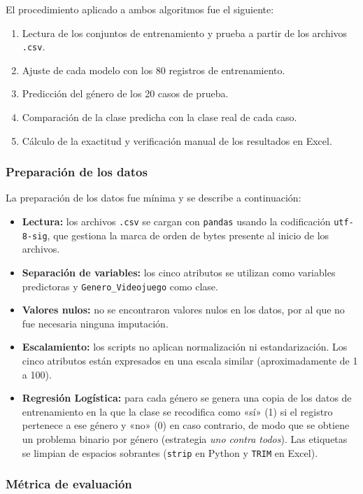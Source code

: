 \documentclass[]{article}
\begin{document}
El procedimiento aplicado a ambos algoritmos fue el siguiente:
\begin{enumerate}[nosep]
  \item Lectura de los conjuntos de entrenamiento y prueba a partir de los archivos \texttt{.csv}.
  \item Ajuste de cada modelo con los 80 registros de entrenamiento.
  \item Predicción del género de los 20 casos de prueba.
  \item Comparación de la clase predicha con la clase real de cada caso.
  \item Cálculo de la exactitud y verificación manual de los resultados en Excel.
\end{enumerate}

\subsubsection{Preparación de los datos}

La preparación de los datos fue mínima y se describe a continuación:
\begin{itemize}[nosep]
  \item \textbf{Lectura:} los archivos \texttt{.csv} se cargan con \texttt{pandas} usando la codificación \texttt{utf-8-sig}, que gestiona la marca de orden de bytes presente al inicio de los archivos.
  \item \textbf{Separación de variables:} los cinco atributos se utilizan como variables predictoras y \texttt{Genero\_Videojuego} como clase.
  \item \textbf{Valores nulos:} no se encontraron valores nulos en los datos, por al que no fue necesaria ninguna imputación.
  \item \textbf{Escalamiento:} los scripts no aplican normalización ni estandarización. Los cinco atributos están expresados en una escala similar (aproximadamente de 1 a 100).
  \item \textbf{Regresión Logística:} para cada género se genera una copia de los datos de entrenamiento en la que la clase se recodifica como «sí» (1) si el registro pertenece a ese género y «no» (0) en caso contrario, de modo que se obtiene un problema binario por género (estrategia \emph{uno contra todos}). Las etiquetas se limpian de espacios sobrantes (\texttt{strip} en Python y \texttt{TRIM} en Excel).
\end{itemize}

\subsubsection{Métrica de evaluación}
\end{document}
